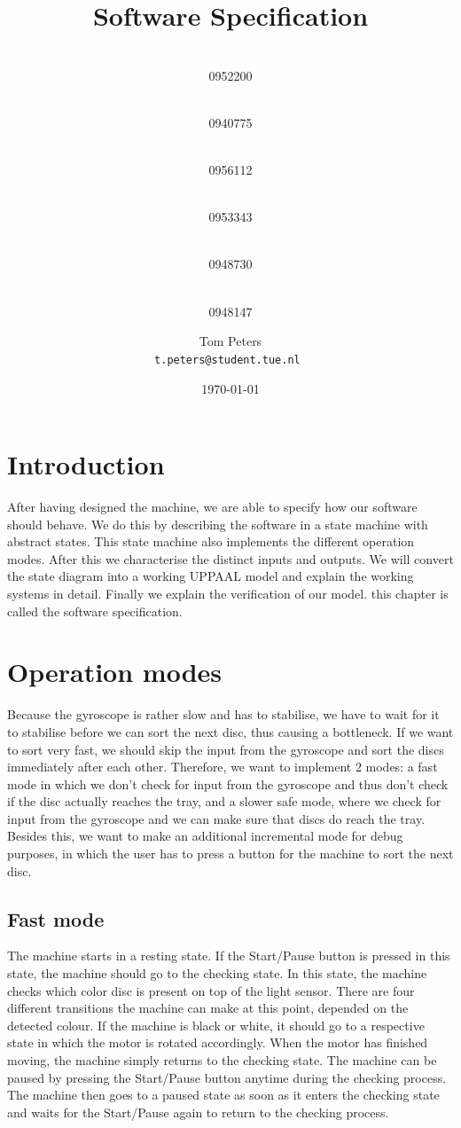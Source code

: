 \documentclass[a4paper,oneside,11pt]{article}
\title{\vspace{-\baselineskip}\sffamily\bfseries Software Specification}
\author{
	\makebox[.25\linewidth]{Sergio van Amerongen}\\0952200 \and
	\makebox[.25\linewidth]{Stefan Cloudt}\\0940775 \and
	\makebox[.25\linewidth]{Daan de Graaf}\\0956112 \and
	\makebox[.25\linewidth]{Robert van Lente}\\0953343 \and
	\makebox[.25\linewidth]{Tom Peters}\\0948730 \and
	\makebox[.25\linewidth]{Berrie Trippe}\\0948147 
	\and \makebox[.75\linewidth]{\textbf{Responsible:}} \and
	Tom Peters\\ \tt{t.peters@student.tue.nl}
}
\date{\today}
\begin{document}
\maketitle

\section{Introduction}
After having designed the machine, we are able to specify how our software should behave. We do this by describing the software in a state machine with abstract states. This state machine also implements the different operation modes. After this we characterise the distinct inputs and outputs. We will convert the state diagram into a working UPPAAL model and explain the working systems in detail. Finally we explain the verification of our model. this chapter is called the software specification.

\section{Operation modes}
Because the gyroscope is rather slow and has to stabilise, we have to wait for it to stabilise before we can sort the next disc, thus causing a bottleneck. If we want to sort very fast, we should skip the input from the gyroscope and sort the discs immediately after each other. Therefore, we want to implement 2 modes: a fast mode in which we don’t check for input from the gyroscope and thus don’t check if the disc actually reaches the tray, and a slower safe mode, where we check for input from the gyroscope and we can make sure that discs do reach the tray. Besides this, we want to make an additional incremental mode for debug purposes, in which the user has to press a button for the machine to sort the next disc.

\subsection{Fast mode}
The machine starts in a resting state. If the Start/Pause button is pressed in this state, the machine should go to the checking state. In this state, the machine checks which color disc is present on top of the light sensor. There are four different transitions the machine can make at this point, depended on the detected colour. If the machine is black or white, it should go to a respective state in which the motor is rotated accordingly. When the motor has finished moving, the machine simply returns to the checking state. The machine can be paused by pressing the Start/Pause button anytime during the checking process. The machine then goes to a paused state as soon as it enters the checking state and waits for the Start/Pause again to return to the checking process.
\end{document}
